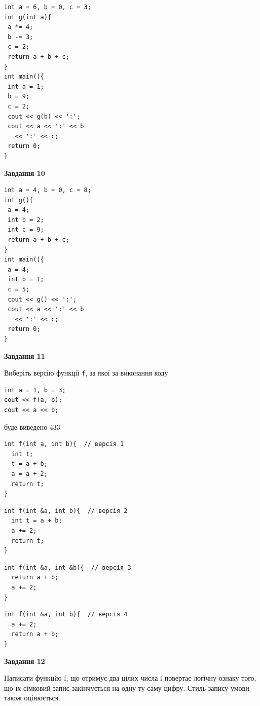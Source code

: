 \documentclass[12pt, ukrainian]{article}
\def\code#1{\Verb!#1!}
\begin{document}
{\begin {large}
\begin{minipage}[t]{7.0cm}
\begin{verbatim}
int a = 6, b = 0, c = 3;
int g(int a){
 a *= 4;
 b -= 3;
 c = 2;
 return a + b + c;
}
int main(){
 int a = 1;
 b = 9;
 c = 2;
 cout << g(b) << ':';
 cout << a << ':' << b 
   << ':' << c;
 return 0;
}
\end{verbatim}



\begin{center}
\textbf{Завдання 10}
\end{center}
\vspace{-8mm}

\begin{verbatim}
int a = 4, b = 0, c = 8;
int g(){
 a = 4;
 int b = 2;
 int c = 9;
 return a + b + c;
}
int main(){
 a = 4;
 int b = 1;
 c = 5;
 cout << g() << ':';
 cout << a << ':' << b 
   << ':' << c;
 return 0;
}
\end{verbatim}

\end{minipage}
\vline \hspace{1mm}
\begin{minipage}[t]{11.0cm}

\begin{center}
\textbf{Завдання 11}
\end{center}
Виберіть версію функції \code{f}, за якої за виконання коду
\begin{verbatim}
int a = 1, b = 3;
cout << f(a, b);
cout << a << b;
\end{verbatim}

буде виведено 433

\begin{verbatim}
int f(int a, int b){  // версія 1
  int t;
  t = a + b;
  a = a + 2;
  return t;
}
\end{verbatim}

\vspace{-8mm}\begin{verbatim}
int f(int &a, int b){  // версія 2
  int t = a + b;
  a += 2;
  return t;
}
\end{verbatim}

\vspace{-8mm}\begin{verbatim}
int f(int &a, int &b){  // версія 3
  return a + b;
  a += 2;
}
\end{verbatim}

\vspace{-8mm}\begin{verbatim}
int f(int &a, int b){  // версія 4
  a += 2;
  return a + b;
}
\end{verbatim}



\begin{center}
\textbf{Завдання 12}
\end{center}

Написати функцiю f, що отримує два цілих числа i повертає логічну ознаку того, що їх сімковий запис закінчується на одну ту саму цифру. Стиль запису умови також оцінюється.\par

\end{minipage}

\end {large}}
\end{document}
